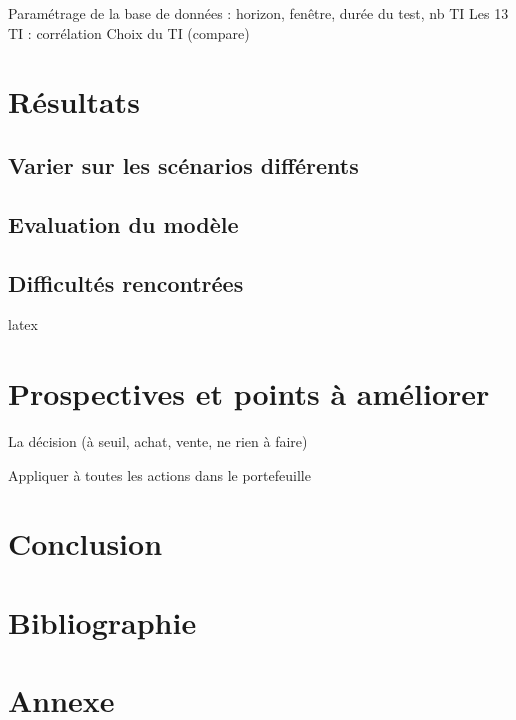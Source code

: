 \documentclass{article}
\begin{document}
Paramétrage de la base de données : horizon, fenêtre, durée du test, nb TI
 Les 13 TI : corrélation
Choix du TI (compare) 



\section{Résultats}

\subsection{Varier sur les scénarios différents}
\subsection{Evaluation du modèle}
\subsection{Difficultés rencontrées}

\begin{imtaCode}{latex}
\end{imtaCode}


\section{Prospectives et points à améliorer}

La décision (à seuil, achat, vente, ne rien à faire)

Appliquer à toutes les actions dans le portefeuille


\section{Conclusion}

\section{Bibliographie}

\section{Annexe}
\end{document}
